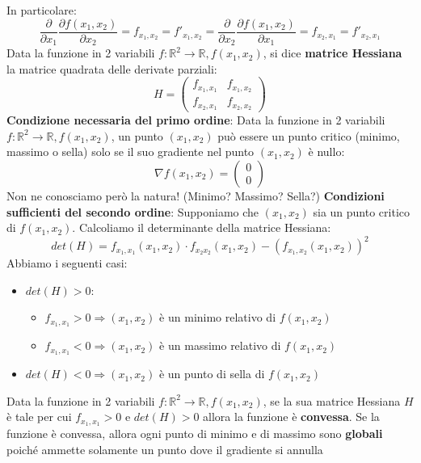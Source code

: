 \documentclass[12pt]{article}
\begin{document}
In particolare:
$$\frac{\partial}{\partial x_1} \frac{\partial f(x_1, x_2)}{\partial x_2} = f_{x_1, x_2} = f'_{x_1, x_2} = \frac{\partial}{\partial x_2} \frac{\partial f(x_1, x_2)}{\partial x_1} = f_{x_2, x_1} = f'_{x_2, x_1}$$
Data la funzione in 2 variabili $f: \mathbb{R}^2 \rightarrow \mathbb{R}, f(x_1, x_2)$, si dice
\textbf{matrice Hessiana} la matrice quadrata delle derivate parziali:
$$H = \begin{pmatrix}
    f_{x_1, x_1} & f_{x_1, x_2} \\
    f_{x_2, x_1} & f_{x_2, x_2}
\end{pmatrix}$$
\textbf{Condizione necessaria del primo ordine}: Data la funzione in 2 variabili $f: \mathbb{R}^2 \rightarrow \mathbb{R}, f(x_1, x_2)$, un punto
$(x_1, x_2)$ può essere un punto critico (minimo, massimo o sella) solo se il suo gradiente nel punto $(x_1, x_2)$ è nullo:
$$\nabla f(x_1, x_2) = \begin{pmatrix}
    0 \\
    0
\end{pmatrix}$$
Non ne conosciamo però la natura! (Minimo? Massimo? Sella?) \newpage
\textbf{Condizioni sufficienti del secondo ordine}:
Supponiamo che $(x_1, x_2)$ sia un punto critico di $f(x_1, x_2)$. Calcoliamo il determinante della matrice Hessiana:
$$det(H) = f_{x_1,x_1} (x_1, x_2) \cdot f_{x_2 x_2}(x_1, x_2) - (f_{x_1, x_2}(x_1, x_2))^2$$
Abbiamo i seguenti casi:
\begin{itemize}
    \item $det(H) > 0$:
    \begin{itemize}
        \item $f_{x_1, x_1} > 0 \Rightarrow (x_1, x_2)$ è un minimo relativo di $f(x_1, x_2)$
        \item $f_{x_1, x_1} < 0 \Rightarrow (x_1, x_2)$ è un massimo relativo di $f(x_1, x_2)$
    \end{itemize}
    \item $det(H) < 0 \Rightarrow (x_1, x_2)$ è un punto di sella di $f(x_1, x_2)$
\end{itemize}
Data la funzione in 2 variabili $f: \mathbb{R}^2 \rightarrow \mathbb{R}, f(x_1, x_2)$, se la sua matrice Hessiana $H$ è tale per cui
$f_{x_1, x_1} > 0$ e $det(H) > 0$ allora la funzione è \textbf{convessa}. Se la funzione è  convessa, allora ogni punto di minimo e di massimo sono
\textbf{globali} poiché ammette solamente un punto dove il gradiente si annulla
\end{document}
